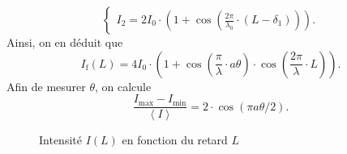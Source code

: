 \begin{enumerate}
\[\begin{cases}
				I_2 = 2I_0 \cdot \left( 1 + \cos\left( \frac{2\pi}{\lambda_0} \cdot (L - \delta_1) \right) \right).
			\end{cases}
		\]
		Ainsi, on en déduit que \[
			I_\mathrm{f}(L) = 4I_0 \cdot \left( 1 + \cos\left( \frac{\pi}{\lambda} \cdot a\theta \right) \cdot \cos\left( \frac{2\pi}{\lambda} \cdot L \right)  \right) 
		.\]
		Afin de mesurer $\theta$, on calcule \[
			\frac{I_\mathrm{max} - I_\mathrm{min}}{\left<I \right>} = 2 \cdot \cos (\pi a \theta / 2)
		.\]
		\begin{figure}[H]
			\centering
			
			\caption{Intensité $I(L)$ en fonction du retard $L$}
		\end{figure}
\end{enumerate}
